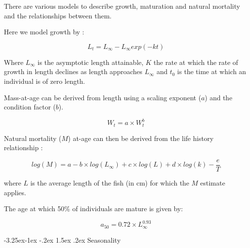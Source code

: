 \documentclass[a4paper, 10pt]{article}
\makeatletter
\renewcommand{\subsection}{\@startsection{subsection}{2}{\z@}%
 {-3.25ex\@plus -1ex \@minus -.2ex}%
 {1.5ex \@plus .2ex}%
 {\normalfont\bfseries\slshape}}
\makeatother
\begin{document}
There are various models to describe growth, maturation and natural mortality and the relationships between them.

Here we model growth by \citep{von1957quantitative}:

\begin{equation}
L_t = L_{\infty} - L_{\infty}exp(-kt) \label{eqVB}
\end{equation}

Where $L_{\infty}$ is the asymptotic length attainable, $K$ the rate at which the
rate of growth in length declines as length approaches $L_{\infty}$ and $t_{0}$ is the time at
which an individual is of zero length.

Mass-at-age can be derived from length using a scaling exponent ($a$) and the condition factor ($b$).

\begin{equation}
W_t = a \times W_t^b \label{eqLW}
\end{equation}

Natural mortality ($M$) at-age can then be derived from the life history relationship \citet{gislason2010does}:

\begin{equation}
log(M) = a - b \times log(L_{\infty}) + c \times log(L) + d \times log(k) - \frac{e}{T} \label{eqGisM}
\end{equation} 

where $L$ is the average length of the fish (in cm) for which the $M$ estimate applies.


The age at which 50\% of individuals are mature is given by:

\begin{equation}
a_{50} = 0.72 \times L_{\infty}^{0.93} \label{eqFBa50}
\end{equation}


\subsection{Seasonality}
\end{document}

